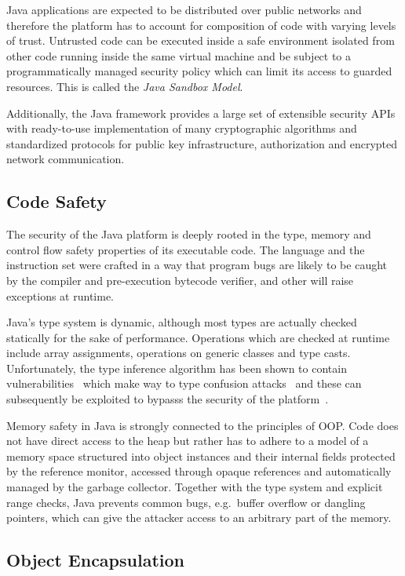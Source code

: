 \documentclass[a4paper,12pt,twoside,openright]{report}
\begin{document}
Java applications are expected to be distributed over public networks and therefore the platform has to account for composition of code with varying levels of trust. Untrusted code can be executed inside a safe environment isolated from other code running inside the same virtual machine and be subject to a programmatically managed security policy which can limit its access to guarded resources. This is called the \emph{Java Sandbox Model}.

Additionally, the Java framework provides a large set of extensible security APIs with ready-to-use implementation of many cryptographic algorithms and standardized protocols for public key infrastructure, authorization and encrypted network communication. 

\subsection{Code Safety}

The security of the Java platform is deeply rooted in the type, memory and control flow safety properties of its executable code. The language and the instruction set were crafted in a way that program bugs are likely to be caught by the compiler and pre-execution bytecode verifier, and other will raise exceptions at runtime. 

Java's type system is dynamic, although most types are actually checked statically for the sake of performance. Operations which are checked at runtime include array assignments, operations on generic classes and type casts. Unfortunately, the type inference algorithm has been shown to contain vulnerabilities~\cite{Suenaga:2012:JavaVulnerability} which make way to type confusion attacks~\cite{Oh:2012:JavaExploitReport} and these can subsequently be exploited to bypasss the security of the platform~\cite{McGraw:1999:SJG:298616}.

Memory safety in Java is strongly connected to the principles of OOP. Code does not have direct access to the heap but rather has to adhere to a model of a memory space structured into object instances and their internal fields protected by the reference monitor, accessed through opaque references and automatically managed by the garbage collector. Together with the type system and explicit range checks, Java prevents common bugs, e.g.\ buffer overflow or dangling pointers, which can give the attacker access to an arbitrary part of the memory.

\subsection{Object Encapsulation}
\end{document}
